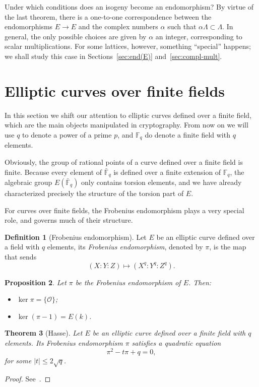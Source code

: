 \documentclass[10pt]{article}
\theoremstyle{plain}
\newtheorem{theorem}{Theorem}
\newtheorem{proposition}[theorem]{Proposition}
\theoremstyle{definition}
\newtheorem{definition}[theorem]{Definition}
\def\F{\ensuremath{\mathbb{F}}}
\def\O{\ensuremath{\mathcal{O}}}
\begin{document}
Under which conditions does an isogeny become an endomorphism? By
virtue of the last theorem, there is a one-to-one correspondence
between the endomorphisms $E\to E$ and the complex numbers $α$ such
that $αΛ⊂Λ$. %
In general, the only possible choices are given by $α$ an integer,
corresponding to scalar multiplications. %
For some lattices, however, something ``special'' happens; we shall
study this case in Sections~\ref{sec:end(E)} and~\ref{sec:compl-mult}.



\section{Elliptic curves over finite fields}
\label{sec:ec-over-ff}

In this section we shift our attention to elliptic curves defined over
a finite field, which are the main objects manipulated in
cryptography. %
From now on we will use $q$ to denote a power of a prime $p$, and
$\F_q$ do denote a finite field with $q$ elements.

Obviously, the group of rational points of a curve defined over a
finite field is finite. %
Because every element of $\bar{\F}_q$ is defined over a finite
extension of $\F_q$, the algebraic group $E(\bar{\F}_q)$ only contains
torsion elements, and we have already characterized precisely the
structure of the torsion part of $E$.

For curves over finite fields, the Frobenius endomorphism plays a very
special role, and governs much of their structure.

\begin{definition}[Frobenius endomorphism]
  Let $E$ be an elliptic curve defined over a field with $q$ elements,
  its \emph{Frobenius endomorphism}, denoted by $π$, is the map that
  sends
  \[(X:Y:Z) \mapsto (X^q:Y^q:Z^q).\]
\end{definition}

\begin{proposition}
  \label{th:frob}
  Let $π$ be the Frobenius endomorphism of $E$. Then:
  \begin{itemize}
  \item $\ker π = \{\O\}$;
  \item $\ker (π-1) = E(k)$.
  \end{itemize}
\end{proposition}

\begin{theorem}[Hasse]
  \label{th:hasse}
  Let $E$ be an elliptic curve defined over a finite field with $q$
  elements. %
  Its Frobenius endomorphism $π$ satisfies a quadratic equation
  \begin{equation}
    \label{eq:frob}
    π^2 - tπ + q = 0,
  \end{equation}
  for some $|t|≤2\sqrt{q}$.
\end{theorem}
\begin{proof}
  See~\cite[V, Th.~2.3.1]{silverman:elliptic}.
\end{proof}
\end{document}
